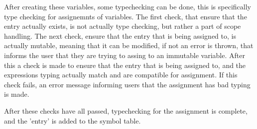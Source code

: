 After creating these variables, some typechecking can be done, this is specifically type checking for assignemnts of variables. The first check, that ensure that the entry actually exists, is not actually type checking, but rather a part of scope handling. The next check, ensure that the entry that is being assigned to, is actually mutable, meaning that it can be modified, if not an error is thrown, that informs the user that they are trying to assing to an immutable variable. After this a check is made to ensure that the entry that is being assigned to, and the expressions typing actually match and are compatible for assignment. If this check fails, an error message informing users that the assignment has bad typing is made.

After these checks have all passed, typechecking for the assignment is complete, and the 'entry' is added to the symbol table.



